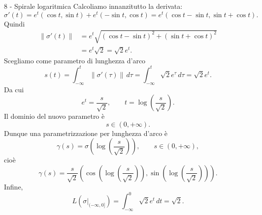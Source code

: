 \documentclass[a4paper]{article}
\begin{document}
\begin{snippetsolution}{8 - Spirale logaritmica}
    Calcoliamo innanzitutto la derivata:
    \[
        \sigma'(t)=e^t(\cos t,\sin t)+e^t(-\sin t,\cos t)
        =
        e^t(\cos t-\sin t,\sin t+\cos t).
    \]
    Quindi
    \begin{align*}
        \left\|\sigma'(t)\right\|
        &=
        e^t\sqrt{(\cos t-\sin t)^2+(\sin t+\cos t)^2}\\
        &=
        e^t\sqrt{2}
        =
        \sqrt{2}e^t.
    \end{align*}
    Scegliamo come parametro di lunghezza d'arco
    \[
        s(t)=\int_{-\infty}^t \left\|\sigma'(\tau)\right\|\,d\tau
        =
        \int_{-\infty}^t \sqrt{2}e^\tau\,d\tau
        =
        \sqrt{2}e^t.
    \]
    Da cui
    \[
        e^t=\frac{s}{\sqrt{2}},
        \qquad
        t=\log\left(\frac{s}{\sqrt{2}}\right).
    \]
    Il dominio del nuovo parametro è
    \[
        s\in(0,+\infty).
    \]
    Dunque una parametrizzazione per lunghezza d'arco è
    \[
        \gamma(s)
        =
        \sigma\left(\log\left(\frac{s}{\sqrt{2}}\right)\right),
        \qquad s\in(0,+\infty),
    \]
    cioè
    \[
        \gamma(s)
        =
        \frac{s}{\sqrt{2}}
        \left(
            \cos\left(\log\left(\frac{s}{\sqrt{2}}\right)\right),
            \sin\left(\log\left(\frac{s}{\sqrt{2}}\right)\right)
        \right).
    \]
    Infine,
    \[
        L\left(\sigma\big|_{(-\infty,0]}\right)
        =
        \int_{-\infty}^{0}\sqrt{2}e^t\,dt
        =
        \sqrt{2}.
    \]
\end{snippetsolution}
\end{document}
